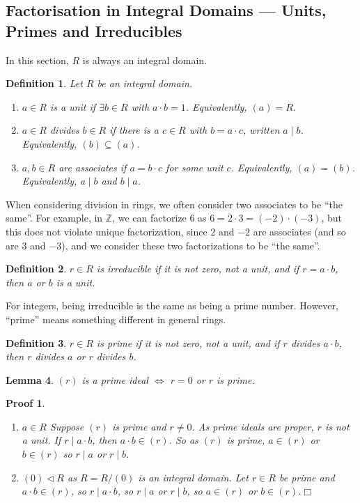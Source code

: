 \documentclass{article}
\theoremstyle{plain}\theoremheaderfont{\normalfont\itshape}\theorembodyfont{\rmfamily}\theoremseparator{.}\newtheorem*{rem}{Remark}\newtheorem*{ex}{Example}\newtheorem*{proof}{Proof}\newtheorem*{altp}{Alternative proof}\newtheorem*{nonex}{Non-Example}
\theoremstyle{plain}\theoremheaderfont{\normalfont\bfseries}\theorembodyfont{\rmfamily}\theoremseparator{.}\newtheorem{thm}{Theorem}[section]\newtheorem{lem}[thm]{Lemma}\newtheorem{prop}[thm]{Proposition}\newtheorem*{cor}{Corollary}\newtheorem{defn}[thm]{Definition}\newtheorem{clm}[thm]{Claim}\newtheorem{clminproof}{Claim}\newtheorem*{notn}{Notation}\newtheorem*{exer}{Exercise}\newtheorem*{lemnn}{Lemma}
\theoremstyle{break}\theoremheaderfont{\normalfont\itshape}\theorembodyfont{\rmfamily}\theoremseparator{.\medskip}\newtheorem*{proofskip}{Proof}\newtheorem*{exs}{Examples}\newtheorem*{rems}{Remarks}\newtheorem*{obs}{Observations}
\theoremstyle{break}\theoremheaderfont{\normalfont\bfseries}\theorembodyfont{\rmfamily}\theoremseparator{.\medskip}\newtheorem{lemskip}[thm]{Lemma}\newtheorem{defnskip}[thm]{Definition}\newtheorem{propskip}[thm]{Proposition}\newtheorem{thmskip}[thm]{Theorem}
\numberwithin{equation}{section}
\newcommand{\qed}{\hfill\ensuremath{\Box}}
\newcommand{\ZZ}{\mathbb{Z}}
\begin{document}
    \subsection{Factorisation in Integral Domains --- Units, Primes and Irreducibles}
    In this section, \(R\) is always an integral domain.
    \begin{defn}
        Let \(R\) be an integral domain.
        \begin{enumerate}[topsep=0pt,label=(\roman*)]
            \item \(a\in R\) is a \textit{unit} if \(\exists b\in R\) with \(a\cdot b=1\). Equivalently, \((a)=R\).
            \item \(a\in R\) \textit{divides} \(b\in R\) if there is a \(c\in R\) with \(b=a\cdot c\), written \(a\mid b\). Equivalently, \((b)\subseteq (a)\).
            \item \(a,b\in R\) are \textit{associates} if \(a=b\cdot c\) for some unit \(c\). Equivalently, \((a)=(b)\). Equivalently, \(a\mid b\) and \(b\mid a\).
        \end{enumerate}
    \end{defn}
    When considering division in rings, we often consider two associates to be ``the same''. For example, in \(\ZZ\), we can factorize \(6\) as \(6=2\cdot 3=(-2)\cdot (-3)\), but this does not violate unique factorization, since \(2\) and \(-2\) are associates (and so are \(3\) and \(-3\)), and we consider these two factorizations to be ``the same''.
    \begin{defn}
        \(r\in R\) is \textit{irreducible} if it is not zero, not a unit, and if \(r=a\cdot b\), then \(a\) or \(b\) is a unit.
    \end{defn}
    For integers, being irreducible is the same as being a prime number. However, ``prime'' means something different in general rings.
    \begin{defn}
        \(r\in R\) is \textit{prime} if it is not zero, not a unit, and if \(r\) divides \(a\cdot b\), then \(r\) divides \(a\) or \(r\) divides \(b\).
    \end{defn}
    \begin{lem}
        \((r)\) is a prime ideal \(\iff\) \(r=0\) or \(r\) is prime.
    \end{lem}
    \begin{proofskip}
        \begin{enumerate}[topsep=0pt,label=(\roman*)]
            \item \(a\in R\) Suppose \((r)\) is prime and \(r\ne 0\). As prime ideals are proper, \(r\) is not a unit. If \(r\mid a\cdot b\), then \(a\cdot b\in (r)\). So as \((r)\) is prime, \(a\in(r)\) or \(b\in(r)\) so \(r\mid a\) or \(r\mid b\).
            \item \((0)\lhd R\) as \(R=R/(0)\) is an integral domain. Let \(r\in R\) be prime and \(a\cdot b\in (r)\), so \(r\mid a\cdot b\), so \(r\mid a\) or \(r\mid b\), so \(a\in(r)\) or \(b\in (r)\).\qed
        \end{enumerate}
    \end{proofskip}
\end{document}
